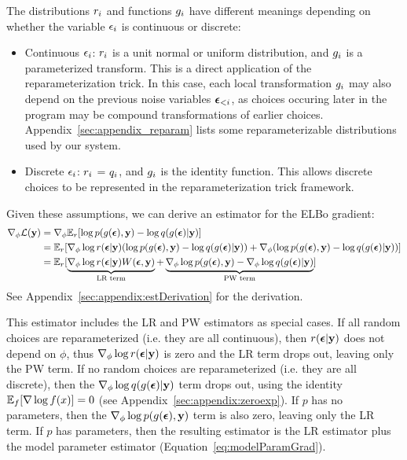 The distributions $r_i$ and functions $g_i$ have different meanings depending on whether the variable $\epsilon_i$ is continuous or discrete:
\begin{itemize}
\item{Continuous $\epsilon_i$: $r_i$ is a unit normal or uniform distribution, and $g_i$ is a parameterized transform. This is a direct application of the reparameterization trick. In this case, each local transformation $g_i$ may also depend on the previous noise variables $\bm{\epsilon}_{<i}$, as choices occuring later in the program may be compound transformations of earlier choices. Appendix~\ref{sec:appendix_reparam} lists some reparameterizable distributions used by our system.}
\item{Discrete $\epsilon_i$: $r_i$ = $q_i$, and $g_i$ is the identity function. This allows discrete choices to be represented in the reparameterization trick framework.}
\end{itemize}
Given these assumptions, we can derive an estimator for the ELBo gradient:
\begin{align}
\label{eq:hybridEstimator}
\gradparams \elbo
%
&= \gradparams \expect_\reparamDist [ \log p(\xformedVars, \observedVars) - \log \guide(\xformedVars | \observedVars) ]\\
%
&= \expect_\reparamDist [ \gradparams \log \reparamDist(\reparamVars | \observedVars) ( \log p(\xformedVars, \observedVars) - \log \guide(\xformedVars | \observedVars) ) + \gradparams( \log p(\xformedVars, \observedVars) - \log \guide(\xformedVars | \observedVars) )]\nonumber\\
%
&= \expect_\reparamDist [ \underbrace{\gradparams \log \reparamDist(\reparamVars | \observedVars) W(\reparamVars, \observedVars)}_{\text{LR term}} + \underbrace{\gradparams \log p(\xformedVars, \observedVars) - \gradparams \log \guide(\xformedVars | \observedVars)}_{\text{PW term}} ]\nonumber
\end{align}
See Appendix~\ref{sec:appendix:estDerivation} for the derivation. 

This estimator includes the LR and PW estimators as special cases. If all random choices are reparameterized (i.e. they are all continuous), then $r(\bm{\epsilon} | \mathbf{y})$ does not depend on $\phi$, thus $\nabla_\phi \log r(\bm{\epsilon} | \mathbf{y})$ is zero and the LR term drops out, leaving only the PW term. If no random choices are reparameterized (i.e. they are all discrete), then the $\nabla_\phi \log q(g(\bm{\epsilon}) | \mathbf{y})$ term drops out, using the identity $\mathbb{E}_f[\nabla \log f(x)] = 0$ (see Appendix~\ref{sec:appendix:zeroexp}). If $p$ has no parameters, then the $\nabla_\phi \log p(g(\bm{\epsilon}), \mathbf{y})$ term is also zero, leaving only the LR term. If $p$ has parameters, then the resulting estimator is the LR estimator plus the model parameter estimator (Equation~\ref{eq:modelParamGrad}).

